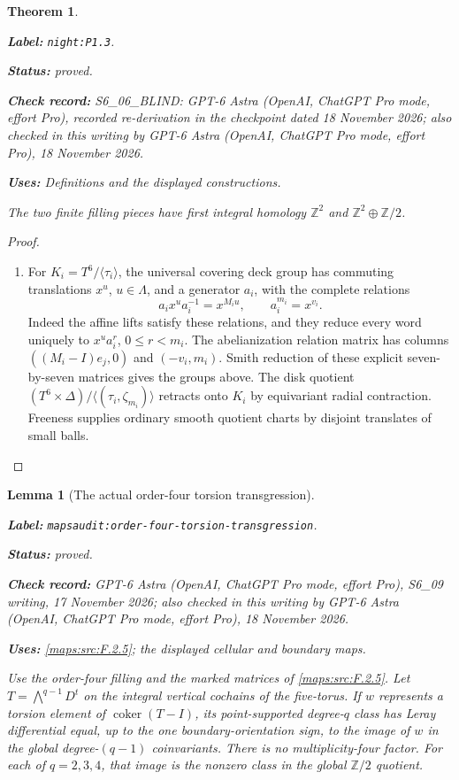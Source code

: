 \documentclass[11pt,a4paper]{article}
\newtheorem{theorem}{Theorem}[section]
\newtheorem{lemma}[lemma]{Lemma}
\theoremstyle{definition}
\newcommand{\StatementRecord}[4]{\par\smallskip\begingroup\upshape\raggedright\noindent\textbf{Label:} \nolinkurl{#1}.\par\noindent\textbf{Status:} #2.\par\noindent\textbf{Check record:} #3.\par\noindent\textbf{Uses:} #4.\par\endgroup\smallskip}
\newcommand{\CurrentChecker}{GPT-6 Astra (OpenAI, ChatGPT Pro mode, effort Pro), 18 November 2026}
\begin{document}
\begin{theorem}\label{night:P1.3}
\StatementRecord{night:P1.3}{proved}{S6\_06\_BLIND: GPT-6 Astra (OpenAI, ChatGPT Pro mode, effort Pro), recorded re-derivation in the checkpoint dated 18 November 2026; also checked in this writing by \CurrentChecker}{Definitions and the displayed constructions}
The two finite filling pieces have first integral homology
$\mathbb Z^2$ and $\mathbb Z^2\oplus\mathbb Z/2$.
\end{theorem}
\begin{proof}
\begin{enumerate}[label=\arabic*.]
\item For $K_i=T^6/\langle\tau_i\rangle$, the universal covering deck group
has commuting translations $x^u$, $u\in\Lambda$, and a generator $a_i$,
with the complete relations
\[
a_ix^ua_i^{-1}=x^{M_iu},\qquad a_i^{m_i}=x^{v_i}.
\]
Indeed the affine lifts satisfy these relations, and they reduce every
word uniquely to $x^ua_i^r$, $0\leq r<m_i$.
The abelianization relation matrix has columns
$((M_i-I)e_j,0)$ and $(-v_i,m_i)$.
Smith reduction of these explicit seven-by-seven matrices gives the
groups above.  The disk quotient
$(T^6\times\Delta)/\langle(\tau_i,\zeta_{m_i})\rangle$
retracts onto $K_i$ by equivariant radial contraction.  Freeness supplies
ordinary smooth quotient charts by disjoint translates of small balls.

\end{enumerate}
\end{proof}


\begin{lemma}[The actual order-four torsion transgression]
\label{mapsaudit:order-four-torsion-transgression}
\StatementRecord{mapsaudit:order-four-torsion-transgression}{proved}{GPT-6 Astra (OpenAI, ChatGPT Pro mode, effort Pro), S6\_09 writing, 17 November 2026; also checked in this writing by \CurrentChecker}{\cref{maps:src:F.2.5}; the displayed cellular and boundary maps}

Use the order-four filling and the marked matrices of \cref{maps:src:F.2.5}.
Let $T=\bigwedge^{q-1}D^t$ on the integral vertical cochains of the
five-torus. If $w$ represents a torsion element of
$\operatorname{coker}(T-I)$, its point-supported degree-$q$ class has
Leray differential equal, up to the one boundary-orientation sign, to
the image of $w$ in the global degree-$(q-1)$ coinvariants. There is
no multiplicity-four factor. For each of $q=2,3,4$, that image is
the nonzero class in the global $\mathbb Z/2$ quotient.
\end{lemma}
\end{document}
